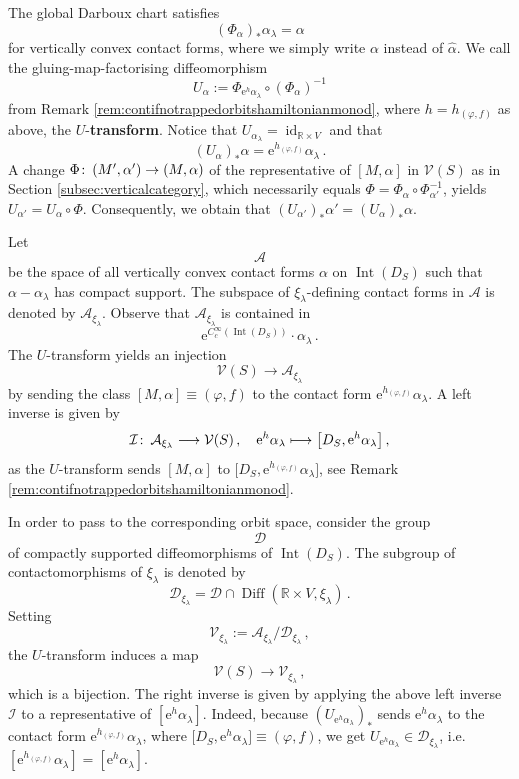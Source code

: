 \documentclass{amsart}
\theoremstyle{definition}
\def\co{\colon\thinspace}
\newcommand{\AAA}{\mathcal A}
\newcommand{\DD}{\mathcal D}
\newcommand{\rme}{\mathrm e}
\newcommand{\II}{\mathcal I}
\newcommand{\R}{\mathbb R}
\newcommand{\VV}{\mathcal V}
\newcommand{\lra}{\longrightarrow}
\newcommand{\ra}{\rightarrow}
\DeclareMathOperator{\Diff}{\mathrm{Diff}}
\DeclareMathOperator{\id}{\mathrm{id}}
\DeclareMathOperator{\Int}{\mathrm{Int}}
\begin{document}
The global Darboux chart satisfies
\[
(\Phi_{\alpha})_*\alpha_{\lambda}=\alpha
\]
for vertically convex contact forms,
where we simply write $\alpha$ instead of $\hat{\alpha}$.
We call the gluing-map-factorising diffeomorphism
  \[
  U_{\alpha}:=
  \Phi_{\rme^h\alpha_{\lambda}}\circ(\Phi_{\alpha})^{-1}
  \]
from Remark \ref{rem:contifnotrappedorbitshamiltonianmonod},
where $h=h_{(\varphi,f)}$ as above,
the $U$-{\bf transform}.
Notice that $U_{\alpha_{\lambda}}=\id_{\R\times V}$
and that
  \[
  (U_{\alpha})_*\alpha=
  \rme^{h_{(\varphi,f)}}\alpha_{\lambda}
  \,.
  \]
A change $\Phi\co(M',\alpha')\ra(M,\alpha)$
of the representative of $[M,\alpha]$ in $\VV(S)$
as in Section \ref{subsec:verticalcategory},
which necessarily equals
$\Phi=\Phi_{\alpha}\circ\Phi_{\alpha'}^{-1}$,
yields $U_{\alpha'}=U_{\alpha}\circ\Phi$.
Consequently,
we obtain that
$(U_{\alpha'})_*\alpha'=(U_{\alpha})_*\alpha$.

Let
  \[
  \AAA
  \]
be the space
of all vertically convex contact forms $\alpha$
on $\Int(D_S)$
such that $\alpha-\alpha_{\lambda}$ has compact support.
The subspace of $\xi_{\lambda}$-defining
contact forms in $\AAA$ is denoted by
$\AAA_{\xi_{\lambda}}$.
Observe that $\AAA_{\xi_{\lambda}}$ is contained in
\[
\rme^{C_c^{\infty}(\Int(D_S))}\cdot\alpha_{\lambda}
\,.
\]
The $U$-transform yields an injection
  \[
  \VV(S)
  \lra
  \AAA_{\xi_{\lambda}}
  \]
by sending
the class $[M,\alpha]\equiv(\varphi,f)$ 
to the contact form
$\rme^{h_{(\varphi,f)}}\alpha_{\lambda}$.
A left inverse is given by
\[
\II\co
\AAA_{\xi_{\lambda}}\lra\VV(S)
\,,
\quad
\rme^h\alpha_{\lambda}
\longmapsto
\big[D_S,\rme^h\alpha_{\lambda}\big]
\,,
\]
as the $U$-transform sends $[M,\alpha]$
to $\big[D_S,\rme^{h_{(\varphi,f)}}\alpha_{\lambda}\big]$,
see Remark \ref{rem:contifnotrappedorbitshamiltonianmonod}.

In order to pass to the corresponding orbit space,
consider the group
\[
\DD
\]
of compactly supported diffeomorphisms
of $\Int(D_S)$.
The subgroup of contactomorphisms
of $\xi_{\lambda}$ is denoted by
\[
\DD_{\xi_{\lambda}}=
\DD\cap\Diff(\R\times V,\xi_{\lambda})
\,.
\]
Setting
\[
  \VV_{\xi_{\lambda}}:=
  \AAA_{\xi_{\lambda}}/\DD_{\xi_{\lambda}}
  \,,
\]
the $U$-transform induces a map
  \[
  \VV(S)
  \lra
  \VV_{\xi_{\lambda}}
  \,,
  \]
which is a bijection.
The right inverse is given by applying
the above left inverse $\II$ to a representative
of $[\rme^h\alpha_{\lambda}]$.
Indeed,
because $(U_{\rme^h\alpha_{\lambda}})_*$ sends
$\rme^h\alpha_{\lambda}$
to the contact form
$\rme^{h_{(\varphi,f)}}\alpha_{\lambda}$,
where
$\big[D_S,\rme^h\alpha_{\lambda}\big]\equiv(\varphi,f)$,
we get $U_{\rme^h\alpha_{\lambda}}\in\DD_{\xi_{\lambda}}$,
i.e.\
$[\rme^{h_{(\varphi,f)}}\alpha_{\lambda}]=[\rme^h\alpha_{\lambda}]$.
\end{document}
